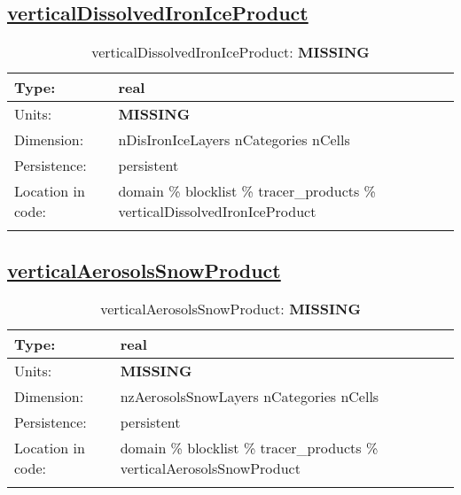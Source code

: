 \subsection[verticalDissolvedIronIceProduct]{\hyperref[sec:var_tab_tracer_products]{verticalDissolvedIronIceProduct}}
\label{subsec:var_sec_tracer_products_verticalDissolvedIronIceProduct}
\begin{center}
\begin{longtable}{| p{2.0in} | p{4.0in} |}
        \hline 
        Type: & real \\
        \hline 
        Units: & {\bf \color{red} MISSING} \\
        \hline 
        Dimension: & nDisIronIceLayers nCategories nCells \\
        \hline 
        Persistence: & persistent \\
        \hline 
         Location in code: & domain \% blocklist \% tracer\_products \% verticalDissolvedIronIceProduct \\
         \hline 
    \caption{verticalDissolvedIronIceProduct: {\bf \color{red} MISSING}}
\end{longtable}
\end{center}
\subsection[verticalAerosolsSnowProduct]{\hyperref[sec:var_tab_tracer_products]{verticalAerosolsSnowProduct}}
\label{subsec:var_sec_tracer_products_verticalAerosolsSnowProduct}
\begin{center}
\begin{longtable}{| p{2.0in} | p{4.0in} |}
        \hline 
        Type: & real \\
        \hline 
        Units: & {\bf \color{red} MISSING} \\
        \hline 
        Dimension: & nzAerosolsSnowLayers nCategories nCells \\
        \hline 
        Persistence: & persistent \\
        \hline 
         Location in code: & domain \% blocklist \% tracer\_products \% verticalAerosolsSnowProduct \\
         \hline 
    \caption{verticalAerosolsSnowProduct: {\bf \color{red} MISSING}}
\end{longtable}
\end{center}
